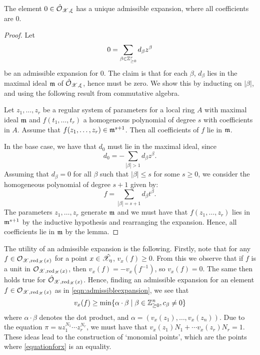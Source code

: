 \begin{lemma}\label{lemma:zerouniqueexpansion} \parencite[Prop. 2.4.6]{MN}
    The element $0 \in \hat{\mathcal{O}}_{\mathscr{X}, \xi}$ has a unique admissible expansion, where all coefficients are $0$.
\end{lemma}
\begin{proof}
    Let
    \[
        0 = \sum_{\beta \in \mathbb{Z}^{r}_{\geq 0}} d_{\beta} z^{\beta}
    \]
    be an admissible expansion for $0$.
    The claim is that for each $\beta$, $d_{\beta}$ lies in the maximal ideal $\mathfrak{m}$ of $\hat{\mathcal{O}}_{\mathscr{X}, \xi}$, hence must be zero.
    We show this by inducting on $|\beta|$, and using the following result from commutative algebra.
    \begin{lemma}\parencite[Prop. 11.20]{AM}
        Let $z_1, \dots, z_r$ be a regular system of parameters for a local ring $A$ with maximal ideal $\mathfrak{m}$ and $f(t_1, \dots, t_r)$ a homogeneous polynomial of degree $s$ with coefficients in $A$. 
        Assume that $f(z_1, \dots, z_r) \in \mathfrak{m}^{s + 1}$. 
        Then all coefficients of $f$ lie in $\mathfrak{m}$.
    \end{lemma}
    In the base case, we have that $d_{0}$ must lie in the maximal ideal, since
    \[
        d_{0} = - \sum_{|\beta| > 1} d_{\beta} z^{\beta}.
    \]
    Assuming that $d_{\beta} = 0$ for all $\beta$ such that $|\beta| \leq s$ for some $s \geq 0$, we consider the homogeneous polynomial of degree $s + 1$ given by:
    \[
        f = \sum_{|\beta| = s + 1} d_{\beta} t^{\beta}.
    \]
    The parameters $z_1, \dots, z_r$ generate $\mathfrak{m}$ and we must have that $f(z_1, \dots, z_r)$ lies in $\mathfrak{m}^{s + 1}$ by the inductive hypothesis and rearranging the expansion.
    Hence, all coefficients lie in $\mathfrak{m}$ by the lemma.
\end{proof}

The utility of an admissible expansion is the following.
Firstly, note that for any $f \in \mathcal{O}_{\mathscr{X}, \operatorname{red}_{\mathscr{X}}(x)}$ for a point $x \in \hat{\mathscr{X}}_{\eta}$, $v_x(f) \geq 0$. 
From this we observe that if $f$ is a unit in $\mathcal{O}_{\mathscr{X}, \operatorname{red}_{\mathscr{X}}(x)}$, then $v_x(f) = -v_x(f^{-1})$, so $v_x(f) = 0$.
The same then holds true for $\hat{\mathcal{O}}_{\mathscr{X}, \operatorname{red}_{\mathscr{X}}(x)}$.
Hence, finding an admissible expansion for an element $f \in \mathcal{O}_{\mathscr{X}, \operatorname{red}_{\mathscr{X}}(x)}$ as in \cref{eqn:admissibleexpansion}, we see that 
\begin{equation}\label{equationforx}
    v_x(f) \geq \min \{ \alpha \cdot \beta \; \vert \; \beta \in \mathbb{Z}_{\geq 0}^{n}, c_{\beta} \neq 0 \}
\end{equation}
where $\alpha \cdot \beta$ denotes the dot product, and $\alpha = (v_x(z_1), \dots, v_x(z_n))$.
Due to the equation $\pi = u z_1^{N_1} \cdots z_r^{N_r}$, we must have that $v_x(z_1) N_1 + \cdots v_x(z_r) N_r = 1$.
These ideas lead to the construction of `monomial points', which are the points where \cref{equationforx} is an equality.

